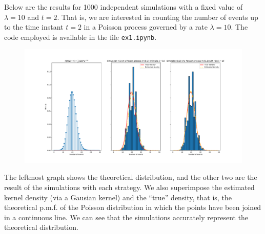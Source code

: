 Below are the results for 1000 independent simulations with a fixed value of $\lambda = 10$ and $t=2$. That is, we are interested in counting the number of events up to the time instant $t=2$ in a Poisson process governed by a rate $\lambda=10$. The code employed is available in the file \verb|ex1.ipynb|.

\begin{figure}[h!]
  \centering
  \includegraphics[width=\textwidth]{img/ex1.pdf}
\end{figure}

The leftmost graph shows the theoretical distribution, and the other two are the result of the simulations with each strategy. We also superimpose the estimated kernel density (via a Gausian kernel) and the ``true'' density, that is, the theoretical p.m.f. of the Poisson distribution in which the points have been joined in a continuous line. We can see that the simulations accurately represent the theoretical distribution.
